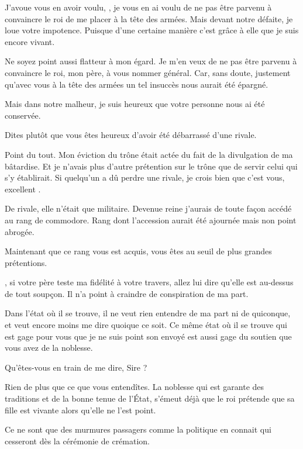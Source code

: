 \begin{drama}
  \generalspeaks J’avoue vous en avoir voulu, \elena, je vous en ai voulu de ne pas être parvenu à convaincre le roi de me placer à la tête des armées. Mais devant notre défaite, je loue votre impotence. Puisque d’une certaine manière c’est grâce à elle que je suis encore vivant.

  \elenaspeaks Ne soyez point aussi flatteur à mon égard. Je m’en veux de ne pas être parvenu à convaincre le roi, mon père, à vous nommer général. Car, sans doute, justement qu’avec vous à la tête des armées un tel insuccès nous aurait été épargné.

  Mais dans notre malheur, je suis heureux que votre personne nous ai été conservée.

  \generalspeaks Dites plutôt que vous êtes heureux d’avoir été débarrassé d’une rivale.

  \elenaspeaks Point du tout. Mon éviction du trône était actée du fait de la divulgation de ma bâtardise. Et je n’avais plus d’autre prétention sur le trône que de  servir celui qui s’y établirait. Si quelqu’un a dû perdre une rivale, je crois bien que c’est vous, excellent \general.

  \generalspeaks De rivale, elle n’était que militaire. Devenue reine j’aurais de toute façon accédé au rang de commodore. Rang dont l’accession aurait été ajournée mais non point abrogée.

  \elenaspeaks Maintenant que ce rang vous est acquis, vous êtes au seuil de plus grandes prétentions.

  \generalspeaks \elena{}, si votre père teste ma fidélité à votre travers, allez lui dire qu’elle est au-dessus de tout soupçon. Il n’a point à craindre de conspiration de ma part.

  \elenaspeaks Dans l’état où il se trouve, il ne veut rien entendre de ma part ni de quiconque, et veut encore moins me dire quoique ce soit. Ce même état où il se trouve qui est gage pour vous que je ne suis point son envoyé est aussi gage du soutien que vous avez de la noblesse.

  \generalspeaks Qu’êtes-vous en train de me dire, Sire ?

  \elenaspeaks Rien de plus que ce que vous entendîtes. La noblesse qui est garante des traditions et de la bonne tenue de l’État, s’émeut déjà que le roi prétende que sa fille est vivante alors qu’elle ne l’est point.

  \generalspeaks Ce ne sont que des murmures passagers comme la politique en connait qui cesseront dès la cérémonie de crémation.


\end{drama}
